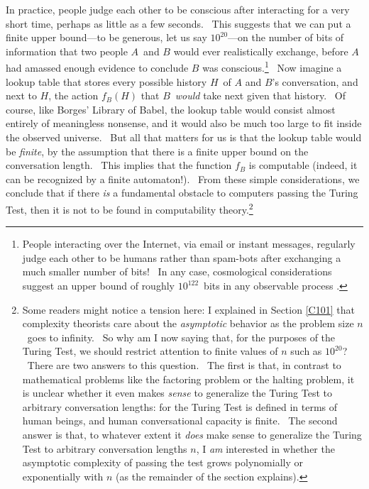 \documentclass[12pt,onecolumn]{article}%
\begin{document}
In practice, people judge each other to be conscious after interacting for a
very short time, perhaps as little as a few seconds. \ This suggests that we
can put a finite upper bound---to be generous, let us say $10^{20}$---on the
number of bits of information that two people $A$\ and $B$ would ever
realistically exchange, before $A$ had amassed enough evidence to conclude $B$
was conscious.\footnote{People interacting over the Internet, via email or
instant messages, regularly judge each other to be humans rather than
spam-bots after exchanging a much smaller number of bits! \ In any case,
cosmological considerations suggest an upper bound of roughly $10^{122}$\ bits
in any observable process \cite{bousso:vac}.} \ Now imagine a lookup table
that stores every possible history $H$\ of $A$ and $B$'s conversation, and
next to $H$, the action $f_{B}\left(  H\right)  $ that $B$\ \textit{would}
take next given that history. \ Of course, like Borges' Library of Babel, the
lookup table would consist almost entirely of meaningless nonsense, and it
would also be much too large to fit inside the observed universe. \ But all
that matters for us is that the lookup table would be \textit{finite}, by the
assumption that there is a finite upper bound on the conversation length.
\ This implies that the function $f_{B}$ is computable (indeed, it can be
recognized by a finite automaton!). \ From these simple considerations, we
conclude that if there \textit{is} a fundamental obstacle to computers passing
the Turing Test, then it is not to be found in computability
theory.\footnote{Some readers might notice a tension here: I explained in
Section \ref{C101} that complexity theorists care about the
\textit{asymptotic} behavior as the problem size $n$\ goes to infinity. \ So
why am I now saying that, for the purposes of the Turing Test, we should
restrict attention to finite values of $n$ such as $10^{20}$? \ There are two
answers to this question. \ The first is that, in contrast to mathematical
problems like the factoring problem or the halting problem, it is unclear
whether it even makes \textit{sense} to generalize the Turing Test to
arbitrary conversation lengths: for the Turing Test is defined in terms of
human beings, and human conversational capacity is finite. \ The second answer
is that, to whatever extent it \textit{does} make sense to generalize the
Turing Test to arbitrary conversation lengths $n$, I \textit{am} interested in
whether the asymptotic complexity of passing the test grows polynomially or
exponentially with $n$ (as the remainder of the section explains).}
\end{document}
